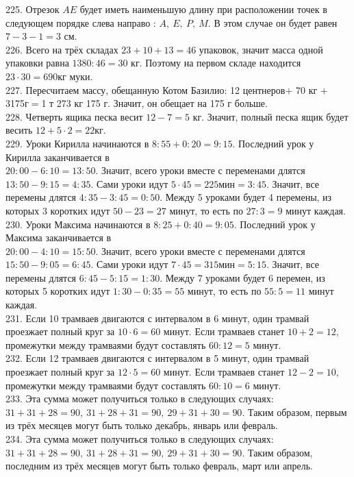 225. Отрезок $AE$ будет иметь наименьшую длину при расположении точек в следующем порядке слева направо : $A,\ E,\ P,\ M.$ В этом случае он будет равен $7-3-1=3$ см.\\
226. Всего на трёх складах $23+10+13=46$ упаковок, значит масса одной упаковки равна $1380:46=30$ кг. Поэтому на первом складе находится $23\cdot30=690$кг муки.\\
227. Пересчитаем массу, обещанную Котом Базилио: 12 центнеров$+$ 70 кг $+$ 3175г$=$1 т 273 кг 175 г. Значит, он обещает на 175 г больше.\\
228. Четверть ящика песка весит $12-7=5$ кг. Значит, полный песка ящик будет весить $12+5\cdot2=22$кг.\\
229. Уроки Кирилла начинаются в $8:55+0:20=9:15.$ Последний урок у Кирилла заканчивается в \\ $20:00-6:10=13:50.$ Значит, всего уроки вместе с переменами длятся $13:50-9:15=4:35.$ Сами уроки идут $5\cdot45=225\text{мин}=3:45.$ Значит, все перемены длятся $4:35-3:45=0:50.$ Между 5 уроками будет 4 перемены, из которых 3 коротких идут $50-23=27$ минут, то есть по $27:3=9$ минут каждая.\\
230. Уроки Максима начинаются в $8:25+0:40=9:05.$ Последний урок у Максима заканчивается в \\ $20:00-4:10=15:50.$ Значит, всего уроки вместе с переменами длятся $15:50-9:05=6:45.$ Сами уроки идут $7\cdot45=315\text{мин}=5:15.$ Значит, все перемены длятся $6:45-5:15=1:30.$ Между 7 уроками будет 6 перемен, из которых 5 коротких идут $1:30-0:35=55$ минут, то есть по $55:5=11$ минут каждая.\\
231. Если 10 трамваев двигаются с интервалом в 6 минут, один трамвай проезжает полный круг за $10\cdot6=60$ минут. Если трамваев станет $10+2=12,$ промежутки между трамваями будут составлять $60:12=5$ минут.\\
232. Если 12 трамваев двигаются с интервалом в 5 минут, один трамвай проезжает полный круг за $12\cdot5=60$ минут. Если трамваев станет $12-2=10,$ промежутки между трамваями будут составлять $60:10=6$ минут.\\
233. Эта сумма может получиться только в следующих случаях: $31+31+28=90,\ 31+28+31=90,\ 29+31+30=90.$ Таким образом, первым из трёх месяцев могут быть только декабрь, январь или февраль.\\
234. Эта сумма может получиться только в следующих случаях: $31+31+28=90,\ 31+28+31=90,\ 29+31+30=90.$ Таким образом, последним из трёх месяцев могут быть только февраль, март или апрель.\\
